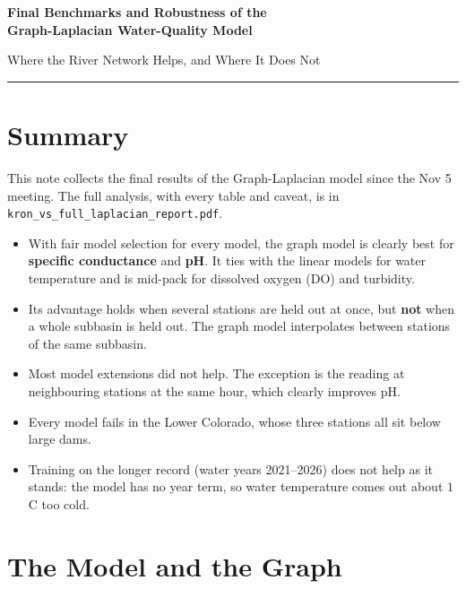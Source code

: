 \documentclass[12pt]{article}
\begin{document}
\begin{center}
{\LARGE\bfseries Final Benchmarks and Robustness of the\\[2pt] Graph-Laplacian Water-Quality Model\par}
\vspace{6pt}
{\large Where the River Network Helps, and Where It Does Not\par}
\vspace{14pt}
\hrule
\end{center}

\section{Summary}

This note collects the final results of the Graph-Laplacian model since the Nov 5 meeting. The full
analysis, with every table and caveat, is in \texttt{kron\_vs\_full\_laplacian\_report.pdf}.

\begin{itemize}
  \item With fair model selection for every model, the graph model is clearly best for
        \textbf{specific conductance} and \textbf{pH}. It ties with the linear models for water
        temperature and is mid-pack for dissolved oxygen (DO) and turbidity.
  \item Its advantage holds when several stations are held out at once, but \textbf{not} when a whole
        subbasin is held out. The graph model interpolates between stations of the same subbasin.
  \item Most model extensions did not help. The exception is the reading at neighbouring stations
        at the same hour, which clearly improves pH.
  \item Every model fails in the Lower Colorado, whose three stations all sit below large dams.
  \item Training on the longer record (water years 2021--2026) does not help as it stands: the
        model has no year term, so water temperature comes out about $1$\,\textdegree C too cold.
\end{itemize}

\section{The Model and the Graph}
\end{document}
